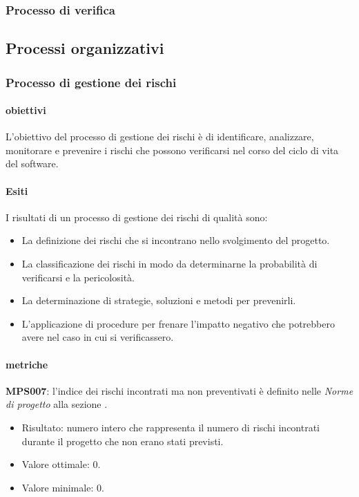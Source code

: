 \documentclass[../piano-di-qualifica.tex]{subfiles}
\begin{document}
\subsubsection{Processo di verifica}%
\label{subs:processo_di_verifica}

\subsection{Processi organizzativi}%
\label{sub:processi_organizzativi}

\subsubsection{Processo di gestione dei rischi}%
\label{sub:processo_di_gestione_dei_rischi}

\paragraph{obiettivi}
\label{par:obiettivi}

L'obiettivo del processo di gestione dei rischi è di identificare, analizzare, monitorare e prevenire i rischi che possono verificarsi nel corso del ciclo di vita del software.

\paragraph{Esiti}
\label{par:esiti}

I risultati di un processo di gestione dei rischi di qualità sono:
\begin{itemize}
	\item La definizione dei rischi che si incontrano nello svolgimento del progetto.
	\item La classificazione dei rischi in modo da determinarne la probabilità di verificarsi e la pericolosità.
    \item La determinazione di strategie, soluzioni e metodi per prevenirli.
    \item L'applicazione di procedure per frenare l'impatto negativo che potrebbero avere nel caso in cui si verificassero. 
\end{itemize}

\paragraph{metriche}
\label{par:metriche}

\textbf{MPS007}: l'indice dei rischi incontrati ma non preventivati è definito nelle \textit{Norme di progetto} alla sezione .
\begin{itemize}
	\item Risultato: numero intero che rappresenta il numero di rischi incontrati durante il progetto che non erano stati previsti.
	\item Valore ottimale: 0.
	\item Valore minimale: 0.
\end{itemize}
\end{document}

